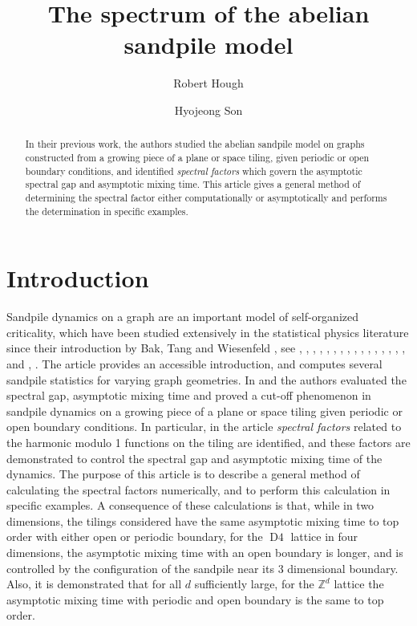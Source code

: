 \documentclass[a4paper, 12pt, notitlepage]{amsart}
\title[Sandpiles]{The spectrum of the abelian sandpile model}
\author{Robert Hough}
\author{Hyojeong Son}
\newcommand{\Dfour}{\operatorname{D4}}
\newcommand{\zed}{\mathbb{Z}}
\theoremstyle{remark}
\begin{document}
\begin{abstract}
In their previous work, the authors studied the abelian sandpile model on graphs constructed from a growing piece of a plane or space tiling, given periodic or open boundary conditions, and identified \emph{spectral factors} which govern the asymptotic spectral gap and asymptotic mixing time.  This article gives a general method of determining the spectral factor either computationally or asymptotically and performs the determination in specific examples.  
\end{abstract}

\maketitle

\section{Introduction} Sandpile dynamics on a graph are an important model of self-organized criticality, which have been studied extensively in the statistical physics literature since their introduction by Bak, Tang and Wiesenfeld \cite{BTW88}, see \cite{D89}, \cite{DM92}, \cite{BIP93}, \cite{P94}, \cite{I94}, \cite{DFF03}, \cite{LH02},  \cite{PR05}, \cite{JPR06}, \cite{SV09}, \cite{LP10}, \cite{DS10}, \cite{FLW10},  \cite{G16}, \cite{KW16}, \cite{NOT17}, and \cite{LPS16}, \cite{PS13}.  The article \cite{KS16} provides an accessible introduction, and computes several sandpile statistics for varying graph geometries.    In \cite{HJL17} and \cite{HS19} the authors evaluated the spectral gap, asymptotic mixing time and proved a cut-off phenomenon in sandpile dynamics on a growing piece of a plane or space tiling given periodic or open boundary conditions.  In particular, in the article \cite{HS19}  \emph{spectral factors} related to the harmonic modulo 1 functions on the tiling are identified, and these factors are demonstrated to control the spectral gap and asymptotic mixing time of the dynamics.  The purpose of this article is to describe a general method of calculating the spectral factors numerically, and to perform this calculation in specific examples.  A consequence of these calculations is that, while in two dimensions, the tilings considered have the same asymptotic mixing time to top order with either open or periodic boundary, for the $\Dfour$ lattice in four dimensions, the asymptotic mixing time with an open boundary is longer, and is controlled by the configuration of the sandpile near its 3 dimensional boundary.  Also, it is demonstrated that for all $d$ sufficiently large, for the $\zed^d$ lattice the asymptotic mixing time with periodic and open boundary is the same to top order. 
\end{document}
